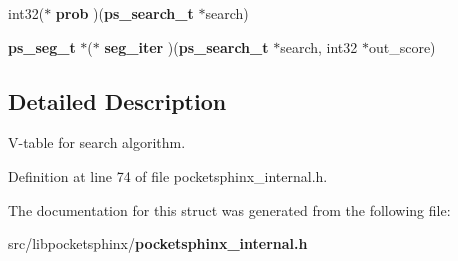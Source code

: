 \begin{DoxyCompactItemize}
\item 
int32($\ast$ {\bfseries prob} )({\bf ps\+\_\+search\+\_\+t} $\ast$search)\label{structps__searchfuncs__s_aa601dc1539edfb40284e94798ba2ab40}

\item 
{\bf ps\+\_\+seg\+\_\+t} $\ast$($\ast$ {\bfseries seg\+\_\+iter} )({\bf ps\+\_\+search\+\_\+t} $\ast$search, int32 $\ast$out\+\_\+score)\label{structps__searchfuncs__s_a7bb9a58892eb6b25f97fac70b05b1f12}

\end{DoxyCompactItemize}


\subsection{Detailed Description}
V-\/table for search algorithm. 

Definition at line 74 of file pocketsphinx\+\_\+internal.\+h.



The documentation for this struct was generated from the following file\+:\begin{DoxyCompactItemize}
\item 
src/libpocketsphinx/{\bf pocketsphinx\+\_\+internal.\+h}\end{DoxyCompactItemize}

